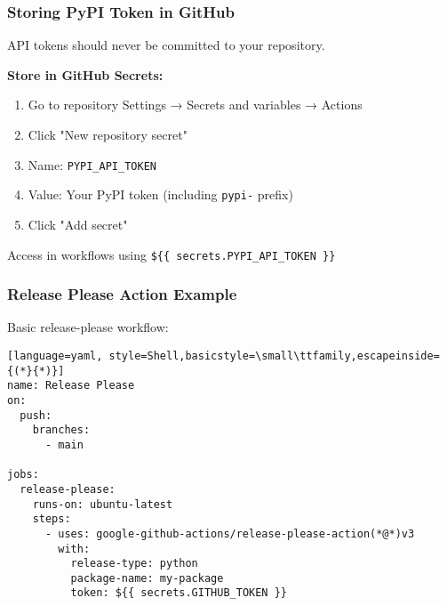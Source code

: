\begin{frame}
	\frametitle{Storing PyPI Token in GitHub}
	\begin{warning}
		{API tokens should never be committed to your repository.}
	\end{warning}
	\pause
	\textbf{Store in GitHub Secrets:}
	\begin{enumerate}
		\item Go to repository Settings → Secrets and variables → Actions
		\item Click "New repository secret"
		\item Name: \texttt{PYPI\_API\_TOKEN}
		\item Value: Your PyPI token (including \texttt{pypi-} prefix)
		\item Click "Add secret"
	\end{enumerate}
	\pause
	\begin{docs}
		{Access in workflows using \texttt{\$\{\{ secrets.PYPI\_API\_TOKEN \}\}}}
	\end{docs}
\end{frame}

\begin{frame}[fragile]
	\frametitle{Release Please Action Example}
	Basic release-please workflow:
	\begin{lstlisting}[language=yaml, style=Shell,basicstyle=\small\ttfamily,escapeinside={(*}{*)}]
name: Release Please
on:
  push:
    branches:
      - main

jobs:
  release-please:
    runs-on: ubuntu-latest
    steps:
      - uses: google-github-actions/release-please-action(*@*)v3
        with:
          release-type: python
          package-name: my-package
          token: ${{ secrets.GITHUB_TOKEN }}
	\end{lstlisting}
\end{frame}

